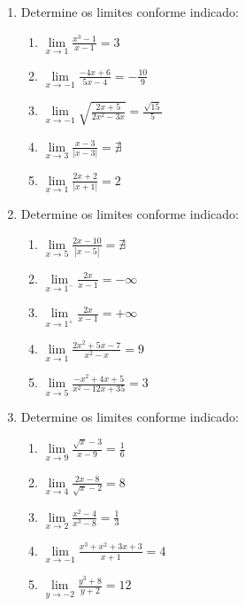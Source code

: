 \documentclass[oneside,a4paper,12pt]{article}
\begin{document}
\begin{enumerate}
	\item Determine os limites conforme indicado:
	\begin{multicols}{2}
	\begin{enumerate}
		\item $\lim\limits_{x\rightarrow 1}\frac{x^3 - 1}{x-1}=3$
		\item $\lim\limits_{x\rightarrow -1}\frac{-4x+6}{5x-4}=-\frac{10}{9}$
		\item $\lim\limits_{x\rightarrow -1}\sqrt{\frac{2x+5}{2x^2 - 3x}}=\frac{\sqrt{15}}{5}$
		\item $\lim\limits_{x\rightarrow 3}\frac{x-3}{|x-3|}=\nexists$
		\item $\lim\limits_{x\rightarrow 1}\frac{2x+2}{|x+1|}=2$
	\end{enumerate}
	\end{multicols}

	\item Determine os limites conforme indicado:
	\begin{multicols}{2}
	\begin{enumerate}
		\item $\lim\limits_{x\rightarrow 5}\frac{2x - 10}{|x-5|} = \nexists$
		\item $\lim\limits_{x\rightarrow 1^{-}}\frac{2x}{x-1} = -\infty$
		\item $\lim\limits_{x\rightarrow 1^{+}}\frac{2x}{x-1} = + \infty$
		\item $\lim\limits_{x\rightarrow 1}\frac{2x^2 + 5x - 7}{x^2 - x} = 9$
		\item $\lim\limits_{x\rightarrow 5}\frac{-x^2 + 4x + 5}{x^2 - 12x + 35} = 3$
	\end{enumerate}
	\end{multicols}

	\item Determine os limites conforme indicado:
	\begin{multicols}{2}
	\begin{enumerate}
		\item $\lim\limits_{x\rightarrow 9}\frac{\sqrt{x} - 3}{x - 9} = \frac{1}{6}$
		\item $\lim\limits_{x\rightarrow 4}\frac{2x - 8}{\sqrt{x} - 2} = 8$
		\item $\lim\limits_{x\rightarrow 2}\frac{x^2 - 4}{x^3 - 8} = \frac{1}{3}$
		\item $\lim\limits_{x\rightarrow -1}\frac{x^3 + x^2 + 3x + 3}{x+1} = 4$
		\item $\lim\limits_{y\rightarrow -2}\frac{y^3 + 8}{y + 2} = 12$
	\end{enumerate}
	\end{multicols}


\end{enumerate}
\end{document}
